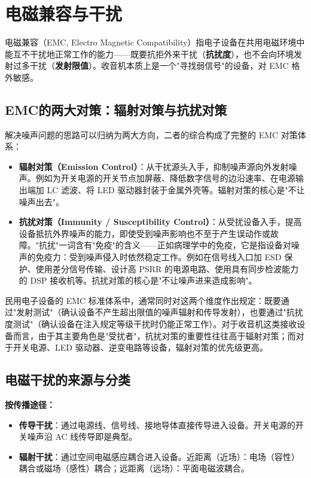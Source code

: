 \documentclass[12pt,UTF8]{ctexbook}
\begin{document}
\section{电磁兼容与干扰}
\label{sec:emc}

电磁兼容（EMC, Electro Magnetic Compatibility）指电子设备在共用电磁环境中能互不干扰地正常工作的能力——既要抗拒外来干扰（\textbf{抗扰度}），也不会向环境发射过多干扰（\textbf{发射限值}）。收音机本质上是一个"寻找弱信号"的设备，对 EMC 格外敏感。

\subsection{EMC的两大对策：辐射对策与抗扰对策}

解决噪声问题的思路可以归纳为两大方向，二者的综合构成了完整的 EMC 对策体系：

\begin{itemize}[leftmargin=2cm]
\item \textbf{辐射对策（Emission Control）}：从干扰源头入手，抑制噪声源向外发射噪声。例如为开关电源的开关节点加屏蔽、降低数字信号的边沿速率、在电源输出端加 LC 滤波、将 LED 驱动器封装于金属外壳等。辐射对策的核心是"不让噪声出去"。
\item \textbf{抗扰对策（Immunity / Susceptibility Control）}：从受扰设备入手，提高设备抵抗外界噪声的能力，即使受到噪声影响也不至于产生误动作或故障。"抗扰"一词含有"免疫"的含义——正如病理学中的免疫，它是指设备对噪声的免疫力：受到噪声侵入时依然稳定工作。例如在信号线入口加 ESD 保护、使用差分信号传输、设计高 PSRR 的电源电路、使用具有同步检波能力的 DSP 接收机等。抗扰对策的核心是"不让噪声进来造成影响"。
\end{itemize}

民用电子设备的 EMC 标准体系中，通常同时对这两个维度作出规定：既要通过"发射测试"（确认设备不产生超出限值的噪声辐射和传导发射），也要通过"抗扰度测试"（确认设备在注入规定等级干扰时仍能正常工作）。对于收音机这类接收设备而言，由于其主要角色是"受扰者"，抗扰对策的重要性往往高于辐射对策；而对于开关电源、LED 驱动器、逆变电路等设备，辐射对策的优先级更高。

\subsection{电磁干扰的来源与分类}

\textbf{按传播途径：}
\begin{itemize}
  \item \textbf{传导干扰}：通过电源线、信号线、接地导体直接传导进入设备。开关电源的开关噪声沿 AC 线传导即是典型。
  \item \textbf{辐射干扰}：通过空间电磁感应耦合进入设备。近距离（近场）：电场（容性）耦合或磁场（感性）耦合；远距离（远场）：平面电磁波耦合。
\end{itemize}
\end{document}
